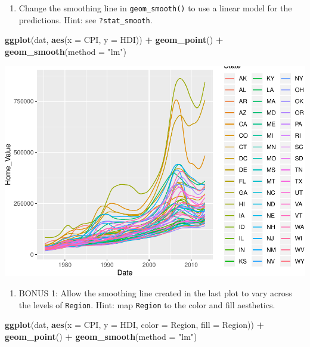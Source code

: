 \documentclass[
]{book}
\newenvironment{Shaded}{\begin{snugshade}}{\end{snugshade}}
\newcommand{\DataTypeTok}[1]{\textcolor[rgb]{0.13,0.29,0.53}{#1}}
\newcommand{\KeywordTok}[1]{\textcolor[rgb]{0.13,0.29,0.53}{\textbf{#1}}}
\newcommand{\NormalTok}[1]{#1}
\newcommand{\OperatorTok}[1]{\textcolor[rgb]{0.81,0.36,0.00}{\textbf{#1}}}
\newcommand{\StringTok}[1]{\textcolor[rgb]{0.31,0.60,0.02}{#1}}
\providecommand{\tightlist}{%
  \setlength{\itemsep}{0pt}\setlength{\parskip}{0pt}}
\begin{document}
\begin{alert}
\begin{enumerate}
\def\labelenumi{\arabic{enumi}.}
\setcounter{enumi}{3}
\tightlist
\item
  Change the smoothing line in \texttt{geom\_smooth()} to use a linear model for the predictions. Hint: see \texttt{?stat\_smooth}.
\end{enumerate}

\begin{Shaded}
\begin{Highlighting}[]
\KeywordTok{ggplot}\NormalTok{(dat, }\KeywordTok{aes}\NormalTok{(}\DataTypeTok{x =}\NormalTok{ CPI, }\DataTypeTok{y =}\NormalTok{ HDI)) }\OperatorTok{+}
\StringTok{  }\KeywordTok{geom\_point}\NormalTok{() }\OperatorTok{+}
\StringTok{  }\KeywordTok{geom\_smooth}\NormalTok{(}\DataTypeTok{method =} \StringTok{"lm"}\NormalTok{)}
\end{Highlighting}
\end{Shaded}

\includegraphics{R/Rgraphics/figures/unnamed-chunk-180-1.pdf}

\begin{enumerate}
\def\labelenumi{\arabic{enumi}.}
\setcounter{enumi}{4}
\tightlist
\item
  BONUS 1: Allow the smoothing line created in the last plot to vary across the levels of \texttt{Region}. Hint: map \texttt{Region} to the color and fill aesthetics.
\end{enumerate}

\begin{Shaded}
\begin{Highlighting}[]
\KeywordTok{ggplot}\NormalTok{(dat, }\KeywordTok{aes}\NormalTok{(}\DataTypeTok{x =}\NormalTok{ CPI, }\DataTypeTok{y =}\NormalTok{ HDI, }\DataTypeTok{color =}\NormalTok{ Region, }\DataTypeTok{fill =}\NormalTok{ Region)) }\OperatorTok{+}
\StringTok{  }\KeywordTok{geom\_point}\NormalTok{() }\OperatorTok{+}
\StringTok{  }\KeywordTok{geom\_smooth}\NormalTok{(}\DataTypeTok{method =} \StringTok{"lm"}\NormalTok{)}
\end{Highlighting}
\end{Shaded}


\end{alert}
\end{document}
